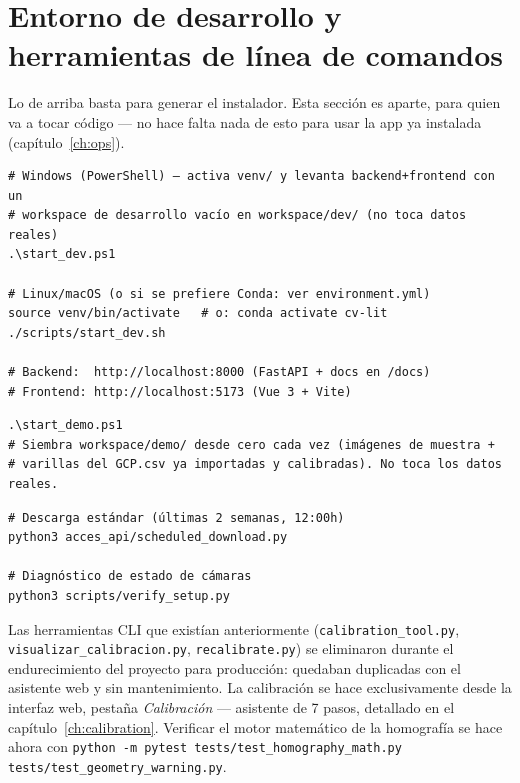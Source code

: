 \section{Entorno de desarrollo y herramientas de línea de comandos}
\label{sec:dev-tools}

Lo de arriba basta para generar el instalador. Esta sección es aparte, para quien va a tocar
código — no hace falta nada de esto para usar la app ya instalada (capítulo~\ref{ch:ops}).

\begin{codebox}
\begin{verbatim}
# Windows (PowerShell) — activa venv/ y levanta backend+frontend con un
# workspace de desarrollo vacío en workspace/dev/ (no toca datos reales)
.\start_dev.ps1

# Linux/macOS (o si se prefiere Conda: ver environment.yml)
source venv/bin/activate   # o: conda activate cv-lit
./scripts/start_dev.sh

# Backend:  http://localhost:8000 (FastAPI + docs en /docs)
# Frontend: http://localhost:5173 (Vue 3 + Vite)
\end{verbatim}
\end{codebox}

\begin{codebox}
\begin{verbatim}
.\start_demo.ps1
# Siembra workspace/demo/ desde cero cada vez (imágenes de muestra +
# varillas del GCP.csv ya importadas y calibradas). No toca los datos reales.
\end{verbatim}
\end{codebox}

\begin{codebox}
\begin{verbatim}
# Descarga estándar (últimas 2 semanas, 12:00h)
python3 acces_api/scheduled_download.py

# Diagnóstico de estado de cámaras
python3 scripts/verify_setup.py
\end{verbatim}
\end{codebox}

\begin{warnbox}
Las herramientas CLI que existían anteriormente (\texttt{calibration\_tool.py},
\texttt{visualizar\_calibracion.py}, \texttt{recalibrate.py}) se eliminaron durante el
endurecimiento del proyecto para producción: quedaban duplicadas con el asistente web y sin
mantenimiento. La calibración se hace exclusivamente desde la interfaz web, pestaña
\textit{Calibración} — asistente de 7 pasos, detallado en el capítulo~\ref{ch:calibration}.
Verificar el motor matemático de la homografía se hace ahora con
\texttt{python -m pytest tests/test\_homography\_math.py tests/test\_geometry\_warning.py}.
\end{warnbox}

